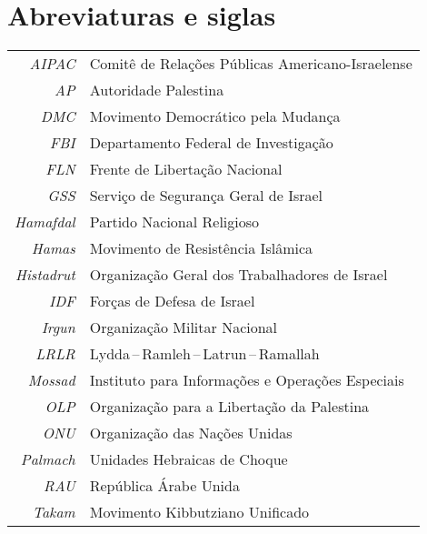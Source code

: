\chapter{Abreviaturas e siglas}

\begingroup%
\begin{tabular}{rl}
\textit{AIPAC} & Comitê de Relações Públicas Americano-Israelense\\
\textit{AP} & Autoridade Palestina\\
\textit{DMC} & Movimento Democrático pela Mudança\\
\textit{FBI} & Departamento Federal de Investigação\\
\textit{FLN} & Frente de Libertação Nacional\\
\textit{GSS} & Serviço de Segurança Geral de Israel\\
\textit{Hamafdal} & Partido Nacional Religioso\\
\textit{Hamas} & Movimento de Resistência Islâmica\\
\textit{Histadrut} & Organização Geral dos Trabalhadores de Israel\\
\textit{IDF} & Forças de Defesa de Israel\\
\textit{Irgun} & Organização Militar Nacional\\
\textit{LRLR} & Lydda\,--\,Ramleh\,--\,Latrun\,--\,Ramallah\\
\textit{Mossad} & Instituto para Informações e Operações Especiais\\
\textit{OLP} & Organização para a Libertação da Palestina\\
\textit{ONU} & Organização das Nações Unidas\\
\textit{Palmach} & Unidades Hebraicas de Choque\\
\textit{RAU} & República Árabe Unida\\
\textit{Takam} & Movimento Kibbutziano Unificado\\
\end{tabular}
\endgroup